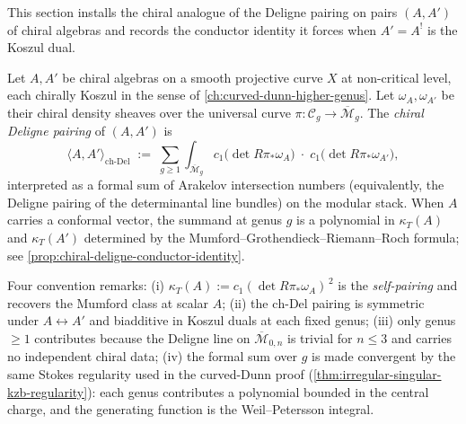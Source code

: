 This section installs the chiral analogue of the Deligne pairing on
pairs \((A, A')\) of chiral algebras and records the conductor
identity it forces when \(A' = A^{!}\) is the Koszul dual.

\begin{definition}
\label{def:chiral-deligne-pairing}
Let \(A, A'\) be chiral algebras on a smooth projective curve \(X\)
at non-critical level, each chirally Koszul in the sense of
\autoref{ch:curved-dunn-higher-genus}. Let
\(\omega_{A}, \omega_{A'}\) be their chiral density sheaves over the
universal curve \(\pi : \mathcal{C}_{g} \to
\overline{\mathcal{M}}_{g}\). The \emph{chiral Deligne pairing} of
\((A, A')\) is
\[
 \langle A, A'\rangle_{\mathrm{ch\text{-}Del}}
 \;:=\;
 \sum_{g \ge 1}
 \int_{\overline{\mathcal{M}}_{g}}
 c_{1}\bigl(\det R\pi_{*}\omega_{A}\bigr)
 \;\cdot\;
 c_{1}\bigl(\det R\pi_{*}\omega_{A'}\bigr),
\]
interpreted as a formal sum of Arakelov intersection numbers
(equivalently, the Deligne pairing of the determinantal line
bundles) on the modular stack. When \(A\) carries a conformal
vector, the summand at genus \(g\) is a polynomial in
\(\kappa_{T}(A)\) and \(\kappa_{T}(A')\) determined by the
Mumford--Grothendieck--Riemann--Roch formula; see
\autoref{prop:chiral-deligne-conductor-identity}.
\end{definition}

Four convention remarks: (i) \(\kappa_{T}(A) := c_{1}(\det
R\pi_{*}\omega_{A})^{\,2}\) is the \emph{self-pairing} and recovers
the Mumford class at scalar \(A\); (ii) the
\(\mathrm{ch\text{-}Del}\) pairing is symmetric under \(A
\leftrightarrow A'\) and biadditive in Koszul duals at each fixed
genus; (iii) only genus \(\ge 1\) contributes because the
Deligne line on \(\overline{\mathcal{M}}_{0, n}\) is trivial for
\(n \le 3\) and carries no independent chiral data; (iv) the formal
sum over \(g\) is made convergent by the same Stokes regularity
used in the curved-Dunn proof
(\autoref{thm:irregular-singular-kzb-regularity}): each genus
contributes a polynomial bounded in the central charge, and the
generating function is the Weil--Petersson integral.

